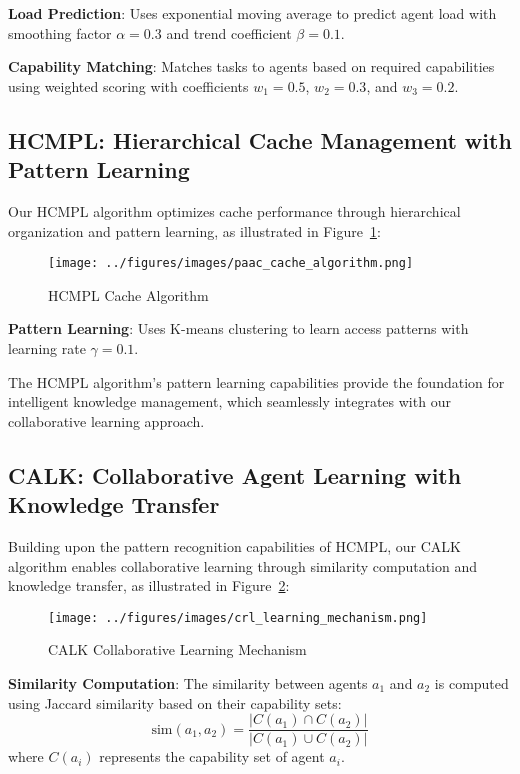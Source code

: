 \documentclass[conference]{IEEEtran}
\begin{document}
\textbf{Load Prediction}: Uses exponential moving average to predict agent load with smoothing factor $\alpha = 0.3$ and trend coefficient $\beta = 0.1$.

\textbf{Capability Matching}: Matches tasks to agents based on required capabilities using weighted scoring with coefficients $w_1 = 0.5$, $w_2 = 0.3$, and $w_3 = 0.2$.

\subsection{HCMPL: Hierarchical Cache Management with Pattern Learning}

Our HCMPL algorithm optimizes cache performance through hierarchical organization and pattern learning, as illustrated in Figure~\ref{fig:hcmpl}:

\begin{figure}[htbp]
\centering
\texttt{[image: ../figures/images/paac\_cache\_algorithm.png]}
\caption{HCMPL Cache Algorithm}
\label{fig:hcmpl}
\end{figure}

\textbf{Pattern Learning}: Uses K-means clustering to learn access patterns with learning rate $\gamma = 0.1$.

The HCMPL algorithm's pattern learning capabilities provide the foundation for intelligent knowledge management, which seamlessly integrates with our collaborative learning approach.

\subsection{CALK: Collaborative Agent Learning with Knowledge Transfer}

Building upon the pattern recognition capabilities of HCMPL, our CALK algorithm enables collaborative learning through similarity computation and knowledge transfer, as illustrated in Figure~\ref{fig:calk}:

\begin{figure}[htbp]
\centering
\texttt{[image: ../figures/images/crl\_learning\_mechanism.png]}
\caption{CALK Collaborative Learning Mechanism}
\label{fig:calk}
\end{figure}

\textbf{Similarity Computation}: The similarity between agents $a_1$ and $a_2$ is computed using Jaccard similarity based on their capability sets:
\begin{equation}
\text{sim}(a_1, a_2) = \frac{|C(a_1) \cap C(a_2)|}{|C(a_1) \cup C(a_2)|}
\end{equation}
where $C(a_i)$ represents the capability set of agent $a_i$.
\end{document}
